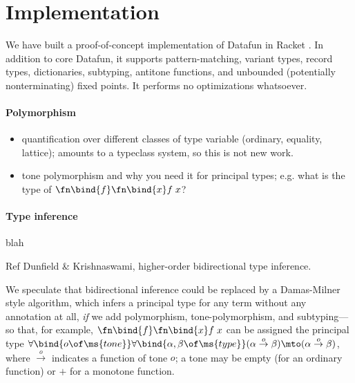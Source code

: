 \section{Implementation}
We have built a proof-of-concept implementation of Datafun in Racket
. In addition to core Datafun, it supports pattern-matching, variant
types, record types, dictionaries, subtyping, antitone functions, and unbounded
(potentially nonterminating) fixed points. It performs no optimizations
whatsoever.




\paragraph{Polymorphism}
\begin{itemize}
\item \TODO quantification over different classes of type variable (ordinary,
  equality, lattice); amounts to a typeclass system, so this is not new work.
\item \TODO tone polymorphism and why you need it for principal types; e.g.
  what is the type of $\fn\bind{f}\fn\bind{x} f\;x$?
\end{itemize}

\paragraph{Type inference} blah

\TODO Ref Dunfield \& Krishnaswami, higher-order bidirectional type inference.

 We speculate that bidirectional inference could be replaced by a
Damas-Milner  style algorithm, which infers a principal type for any
term without any annotation at all, \emph{if} we add polymorphism,
tone-polymorphism, and subtyping---so that, for example, $\fn\bind{f}\fn\bind{x}
f\;x$ can be assigned the principal type
$\forall\bind{o\of\ms{tone}}\forall\bind{\alpha,\beta \of \ms{type}} (\alpha
\overset{o}\to \beta) \mto (\alpha \overset{o}\to \beta)$, where
$\overset{o}\to$ indicates a function of tone $o$; a tone may be empty (for an
ordinary function) or ${+}$ for a monotone function.


